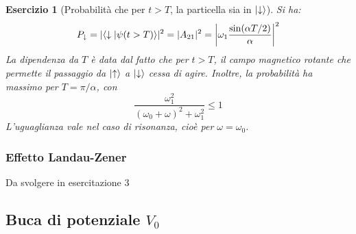 \documentclass[11pt, a4paper]{scrartcl} %
\numberwithin{equation}{subsection}
\theoremstyle{style2}
\theoremstyle{style1}
\newtheorem{esercizio}{Esercizio}[section]
\begin{document}
\begin{esercizio}
	[Probabilit\`a che per $t>T$, la particella sia in $\ket{\downarrow} $]	


	Si ha:
	\begin{equation}
	P_\downarrow = \lvert \braket{\downarrow|\psi (t>T)}  \rvert ^2 = \lvert A_{21} \rvert ^2 = \left\lvert \omega_1 \frac{\sin (\alpha T / 2)}{\alpha } \right\rvert ^2
	\end{equation}
	La dipendenza da $T $ \`e data dal fatto che per $t>T$, il campo magnetico rotante che permette il passaggio da $\ket{\uparrow} $ a $\ket{\downarrow} $ cessa di agire. 
	Inoltre, la probabilit\`a ha massimo per $T = \pi / \alpha $, con
	\begin{equation}
		\frac{\omega_1^2 }{(\omega_0+\omega)^2 + \omega_1^2}\le  1
	\end{equation}
	L'uguaglianza vale nel caso di risonanza, cio\`e per $\omega = \omega_0$.
\end{esercizio}
\subsubsection{Effetto Landau-Zener}

\begin{center}
\color{asdf} Da svolgere in esercitazione 3
\end{center}

\subsection{Buca di potenziale $V_0$}
\end{document}
